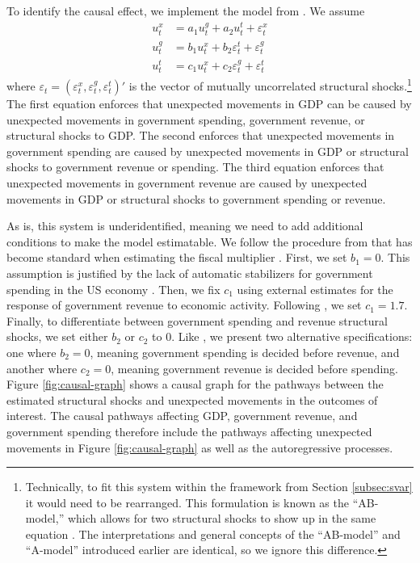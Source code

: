 To identify the causal effect, we implement the model from \textcite{blanchard2002empirical}. We assume
\begin{align*}
    u_t^x &= a_1 u_t^g + a_2 u_t^t + \varepsilon_t^x \\
    u_t^g &= b_1 u_t^x + b_2 \varepsilon_t^t + \varepsilon_t^g \\
    u_t^t &= c_1 u_t^x + c_2 \varepsilon_t^g + \varepsilon_t^t
\end{align*}
where $\varepsilon_t = (\varepsilon_t^x, \varepsilon_t^g, \varepsilon_t^t)'$ is the vector of mutually uncorrelated structural shocks.\footnote{Technically, to fit this system within the framework from Section \ref{subsec:svar} it would need to be rearranged. This formulation is known as the ``AB-model,'' which allows for two structural shocks to show up in the same equation \parencite{lutkepohl2005new}. The interpretations and general concepts of the ``AB-model'' and ``A-model'' introduced earlier are identical, so we ignore this difference.} The first equation enforces that unexpected movements in GDP can be caused by unexpected movements in government spending, government revenue, or structural shocks to GDP. The second enforces that unexpected movements in government spending are caused by unexpected movements in GDP or structural shocks to government revenue or spending. The third equation enforces that unexpected movements in government revenue are caused by unexpected movements in GDP or structural shocks to government spending or revenue.

As is, this system is underidentified, meaning we need to add additional conditions to make the model estimatable. We follow the procedure from \textcite{blanchard2002empirical} that has become standard when estimating the fiscal multiplier \parencites{ramey2011can}{caldara2017analytics}{deleidi2021quantifying}. First, we set $b_1 = 0$. This assumption is justified by the lack of automatic stabilizers for government spending in the US economy \parencites{caldara2017analytics}. Then, we fix $c_1$ using external estimates for the response of government revenue to economic activity. Following \textcite{lutz2010fiscal}, we set $c_1 = 1.7$. Finally, to differentiate between government spending and revenue structural shocks, we set either $b_2$ or $c_2$ to 0. Like \textcite{blanchard2002empirical}, we present two alternative specifications: one where $b_2 = 0$, meaning government spending is decided before revenue, and another where $c_2 = 0$, meaning government revenue is decided before spending. Figure \ref{fig:causal-graph} shows a causal graph for the pathways between the estimated structural shocks and unexpected movements in the outcomes of interest. The causal pathways affecting GDP, government revenue, and government spending therefore include the pathways affecting unexpected movements in Figure \ref{fig:causal-graph} as well as the autoregressive processes.

